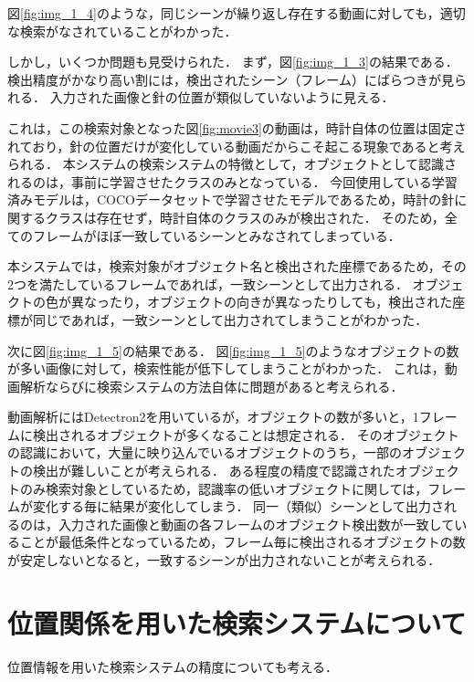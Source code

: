 \documentclass[a4j,12pt,dvipdfmx]{jreport}
\begin{document}
図\ref{fig:img_1_4}のような，同じシーンが繰り返し存在する動画に対しても，適切な検索がなされていることがわかった．

しかし，いくつか問題も見受けられた．
まず，図\ref{fig:img_1_3}の結果である．
検出精度がかなり高い割には，検出されたシーン（フレーム）にばらつきが見られる．
入力された画像と針の位置が類似していないように見える．

これは，この検索対象となった図\ref{fig:movie3}の動画は，時計自体の位置は固定されており，針の位置だけが変化している動画だからこそ起こる現象であると考えられる．
本システムの検索システムの特徴として，オブジェクトとして認識されるのは，事前に学習させたクラスのみとなっている．
今回使用している学習済みモデルは，COCOデータセットで学習させたモデルであるため，時計の針に関するクラスは存在せず，時計自体のクラスのみが検出された．
そのため，全てのフレームがほぼ一致しているシーンとみなされてしまっている．

本システムでは，検索対象がオブジェクト名と検出された座標であるため，その2つを満たしているフレームであれば，一致シーンとして出力される．
オブジェクトの色が異なったり，オブジェクトの向きが異なったりしても，検出された座標が同じであれば，一致シーンとして出力されてしまうことがわかった．

次に図\ref{fig:img_1_5}の結果である．
図\ref{fig:img_1_5}のようなオブジェクトの数が多い画像に対して，検索性能が低下してしまうことがわかった．
これは，動画解析ならびに検索システムの方法自体に問題があると考えられる．

動画解析にはDetectron2を用いているが，オブジェクトの数が多いと，1フレームに検出されるオブジェクトが多くなることは想定される．
そのオブジェクトの認識において，大量に映り込んでいるオブジェクトのうち，一部のオブジェクトの検出が難しいことが考えられる．
ある程度の精度で認識されたオブジェクトのみ検索対象としているため，認識率の低いオブジェクトに関しては，フレームが変化する毎に結果が変化してしまう．
同一（類似）シーンとして出力されるのは，入力された画像と動画の各フレームのオブジェクト検出数が一致していることが最低条件となっているため，フレーム毎に検出されるオブジェクトの数が安定しないとなると，一致するシーンが出力されないことが考えられる．

\section{位置関係を用いた検索システムについて}\label{chap4-3}
位置情報を用いた検索システムの精度についても考える．
\end{document}
